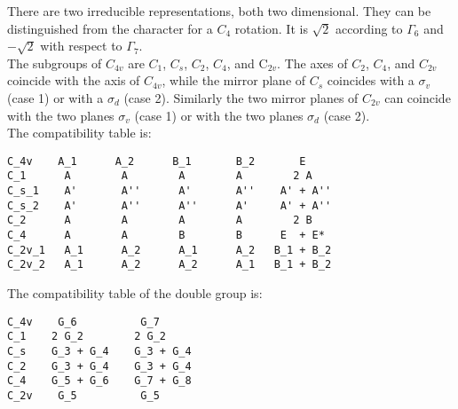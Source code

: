 \documentclass[12pt,a4paper]{article}
\begin{document}
There are two irreducible representations, both two dimensional. They can be
distinguished from the character for a $C_4$ rotation. It is
$\sqrt{2}$ according to $\Gamma_6$ and $-\sqrt{2}$ with respect to 
$\Gamma_7$. \\
The subgroups of $C_{4v}$ are $C_1$, $C_s$, $C_2$, $C_4$, and C$_{2v}$. 
The axes of $C_2$, $C_4$, and $C_{2v}$ coincide with the axis of $C_{4v}$, 
while the mirror plane of $C_s$ coincides with a $\sigma_v$ 
(case 1) or with a $\sigma_d$ (case 2). Similarly the two
mirror planes of $C_{2v}$ can coincide with the two planes $\sigma_v$ 
(case 1) or with the two planes $\sigma_d$ (case 2).\\
The compatibility table is:
\begin{verbatim}
C_4v    A_1      A_2      B_1       B_2       E
C_1      A        A        A        A        2 A
C_s_1    A'       A''      A'       A''    A' + A''
C_s_2    A'       A''      A''      A'     A' + A''
C_2      A        A        A        A        2 B
C_4      A        A        B        B      E  + E*   
C_2v_1   A_1      A_2      A_1      A_2   B_1 + B_2
C_2v_2   A_1      A_2      A_2      A_1   B_1 + B_2
\end{verbatim}
The compatibility table of the double group is:
\begin{verbatim}
C_4v    G_6          G_7  
C_1    2 G_2        2 G_2
C_s    G_3 + G_4    G_3 + G_4
C_2    G_3 + G_4    G_3 + G_4
C_4    G_5 + G_6    G_7 + G_8
C_2v    G_5          G_5
\end{verbatim}

\newpage
\end{document}
